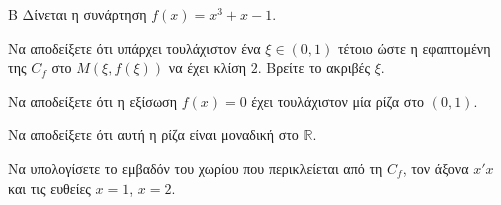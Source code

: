 \begin{thema}{Β}
Δίνεται η συνάρτηση $f(x) = x^3 + x - 1$.
\begin{erwthma}
\item Να αποδείξετε ότι υπάρχει τουλάχιστον ένα $\xi \in (0, 1)$ τέτοιο ώστε η εφαπτομένη της $C_f$ στο $M(\xi, f(\xi))$ να έχει κλίση $2$. Βρείτε το ακριβές $\xi$.
\item Να αποδείξετε ότι η εξίσωση $f(x) = 0$ έχει τουλάχιστον μία ρίζα στο $(0, 1)$.
\item Να αποδείξετε ότι αυτή η ρίζα είναι μοναδική στο $\mathbb{R}$.
\item Να υπολογίσετε το εμβαδόν του χωρίου που περικλείεται από τη $C_f$, τον άξονα $x'x$ και τις ευθείες $x=1$, $x=2$.
\end{erwthma}
\end{thema}
